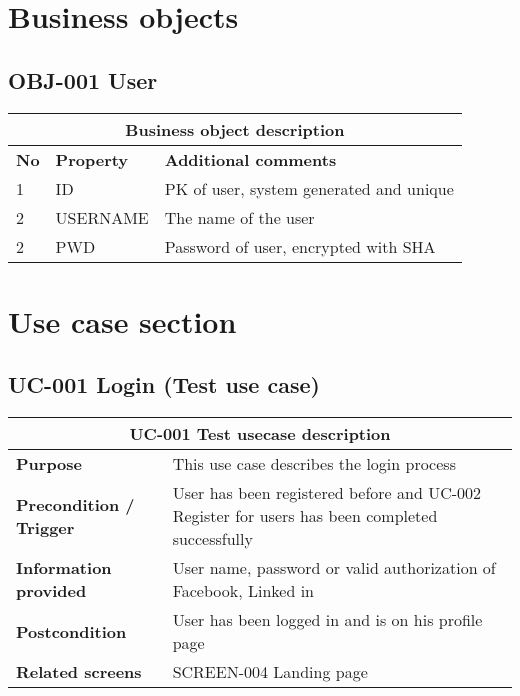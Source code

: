 \documentclass{article}
\begin{document}

\section{Business objects}

\subsection{OBJ-001 User}

\begin{table}[h]
\begin{tabularx}{\textwidth}{|l|X|X|}
\hline
 \multicolumn{3}{|c|}{\textbf{Business object description} } \\
\hline
\hline
\textbf{No} & \textbf{Property} & \textbf{Additional comments}   \\
\hline
1 & ID & PK of user, system generated and unique \\
\hline
2 & USERNAME & The name of the user \\
\hline
2 & PWD & Password of user, encrypted with SHA \\
\hline

\end{tabularx}
\end{table}



\newpage

\section{Use case section}

\subsection{UC-001 Login (Test use case)}

\begin{table}[h]
\begin{tabularx}{\textwidth}{|l|X|}
\hline

 \multicolumn{2}{|c|}{\textbf{UC-001 Test usecase description} } \\
\hline
\hline
\textbf{Purpose} & This use case describes the login process  \\
\hline
\textbf{Precondition / Trigger} & User has been registered before and UC-002 Register for users has been completed successfully
\\
\hline
\textbf{Information provided} & User name, password or valid authorization of Facebook, Linked in
\\
\hline
\textbf{Postcondition} & User has been logged in and is on his profile page
\\
\hline
\textbf{Related screens} & SCREEN-004 Landing page
\\
\hline

\end{tabularx}
\end{table}
\end{document}
